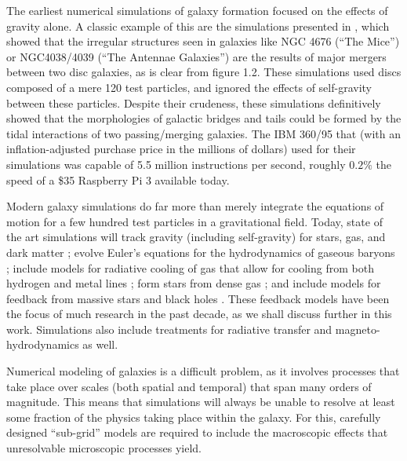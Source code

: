 The earliest numerical simulations of galaxy formation focused on the effects of
gravity alone.  A classic example of this are the simulations presented in
\citet{Toomre1972}, which showed that the irregular structures seen in galaxies
like NGC 4676 (``The Mice'') or NGC4038/4039 (``The Antennae Galaxies'') are the
results of major mergers between two disc galaxies, as is clear from figure 1.2.
These simulations used discs composed of a mere 120 test particles, and ignored
the effects of self-gravity between these particles.  Despite their crudeness,
these simulations definitively showed that the morphologies of galactic bridges and tails could be
formed by the tidal interactions of two passing/merging galaxies.  The IBM
360/95 that \citet{Toomre1972} (with an inflation-adjusted purchase price in the
millions of dollars) used for their simulations was capable of 5.5 million
instructions per second, roughly $0.2\%$ the speed of a \$35 Raspberry Pi 3
available today.

Modern galaxy simulations do far more than merely integrate the equations of
motion for a few hundred test particles in a gravitational field.  Today, state
of the art simulations will track gravity (including self-gravity) for stars,
gas, and dark matter \citep{Aarseth1980,Stadel2001,Dehnen2002}; evolve Euler's
equations for the hydrodynamics of gaseous baryons
\citep{Wadsley2004,Teyssier2002,Bryan2014}; include models for radiative cooling
of gas that allow for cooling from both hydrogen and metal lines
\citep{Marri2003,Shen2010}; form stars from dense gas
\citep{Katz1992,Agertz2015}; and include models for feedback from massive stars
and black holes \citep{Katz1992,Springel2003,DiMatteo2005}.  These feedback
models have been the focus of much research in the past decade, as we shall
discuss further in this work.  Simulations also include treatments
for radiative transfer \citep{Gendelev2012,Krumholz2013} and
magneto-hydrodynamics \citep{Girichidis2015} as well.

Numerical modeling of galaxies is a difficult problem, as it involves processes
that take place over scales (both spatial and temporal) that span many orders of
magnitude.  This means that simulations will always be unable to resolve at
least some fraction of the physics taking place within the galaxy.  For this,
carefully designed ``sub-grid'' models are required to include the macroscopic
effects that unresolvable microscopic processes yield. 

